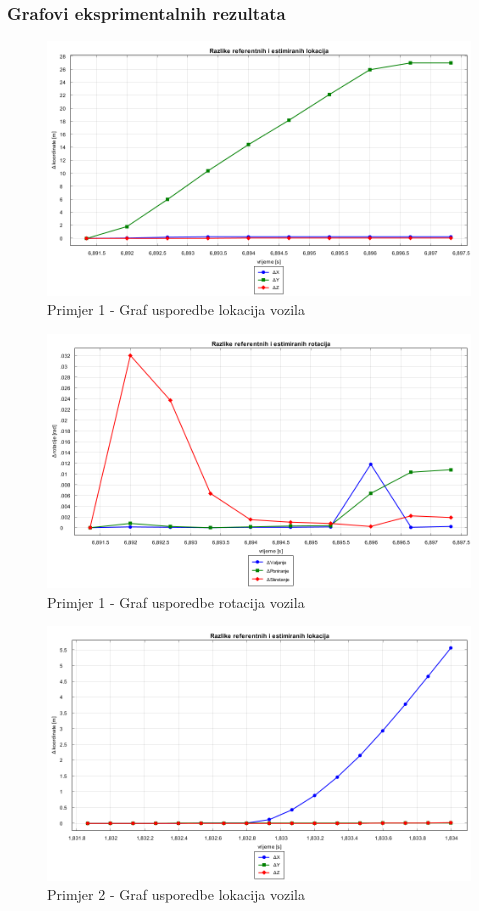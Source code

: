 \subsubsection{Grafovi eksprimentalnih rezultata}
\begin{figure}[H]
  \includegraphics[scale=0.4]{images/imgsvox/1_zavoj_lokacije.png}
  \caption{Primjer 1 - Graf usporedbe lokacija vozila}
  \label{eval:primjer_1_lokacija_vox}
\end{figure}
\begin{figure}[H]
  \includegraphics[scale=0.4]{images/imgsvox/1_zavoj_rotacije.png}
  \caption{Primjer 1 - Graf usporedbe rotacija vozila}
  \label{eval:primjer_1_rotacija_vox}
\end{figure}
\begin{figure}[H]
  \includegraphics[scale=0.4]{images/imgsvox/2_ravno_lokacije.png}
  \caption{Primjer 2 - Graf usporedbe lokacija vozila}
  \label{eval:primjer_2_lokacija_vox}
\end{figure}
